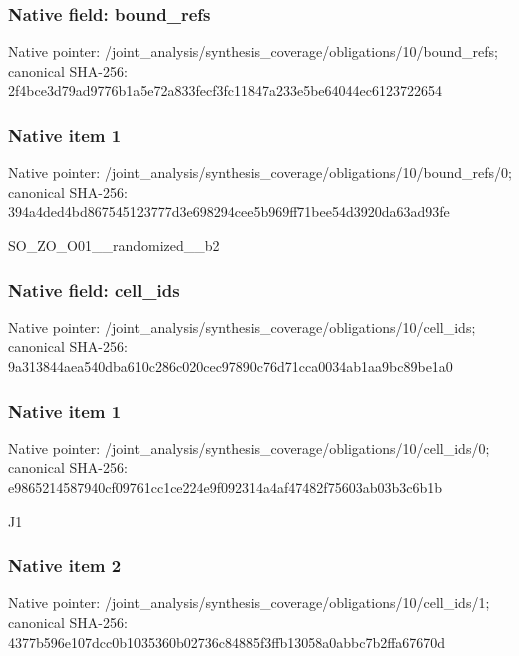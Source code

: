 \documentclass[10pt,a4paper]{article}
\begin{document}
\subsubsection{Native field: bound\_refs}


Native pointer: /joint\_analysis/synthesi\allowbreak{}s\_coverage/obligations/1\allowbreak{}0/bound\_refs; canonical SHA-256: 2f4bce3d79ad9776b1a5e72a\allowbreak{}833fecf3fc11847a233e5be6\allowbreak{}4044ec6123722654



\subsubsection{Native item 1}


Native pointer: /joint\_analysis/synthesi\allowbreak{}s\_coverage/obligations/1\allowbreak{}0/bound\_refs/0; canonical SHA-256: 394a4ded4bd867545123777d\allowbreak{}3e698294cee5b969ff71bee5\allowbreak{}4d3920da63ad93fe


SO\_ZO\_O01\_\_randomized\_\_b2


\subsubsection{Native field: cell\_ids}


Native pointer: /joint\_analysis/synthesi\allowbreak{}s\_coverage/obligations/1\allowbreak{}0/cell\_ids; canonical SHA-256: 9a313844aea540dba610c286\allowbreak{}c020cec97890c76d71cca003\allowbreak{}4ab1aa9bc89be1a0



\subsubsection{Native item 1}


Native pointer: /joint\_analysis/synthesi\allowbreak{}s\_coverage/obligations/1\allowbreak{}0/cell\_ids/0; canonical SHA-256: e9865214587940cf09761cc1\allowbreak{}ce224e9f092314a4af47482f\allowbreak{}75603ab03b3c6b1b


J1


\subsubsection{Native item 2}


Native pointer: /joint\_analysis/synthesi\allowbreak{}s\_coverage/obligations/1\allowbreak{}0/cell\_ids/1; canonical SHA-256: 4377b596e107dcc0b1035360\allowbreak{}b02736c84885f3ffb13058a0\allowbreak{}abbc7b2ffa67670d
\end{document}
